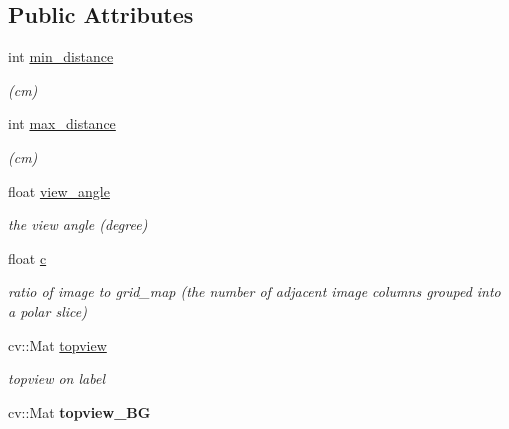 \subsection*{Public Attributes}
\begin{DoxyCompactItemize}
\item 
\hypertarget{class_top_view_a56c819ab3208d77a4b6f9dff80339524}{}int \hyperlink{class_top_view_a56c819ab3208d77a4b6f9dff80339524}{min\+\_\+distance}\label{class_top_view_a56c819ab3208d77a4b6f9dff80339524}

\begin{DoxyCompactList}\small\item\em (cm) \end{DoxyCompactList}\item 
\hypertarget{class_top_view_a4d6987318631da634e6121bc563d5bfb}{}int \hyperlink{class_top_view_a4d6987318631da634e6121bc563d5bfb}{max\+\_\+distance}\label{class_top_view_a4d6987318631da634e6121bc563d5bfb}

\begin{DoxyCompactList}\small\item\em (cm) \end{DoxyCompactList}\item 
\hypertarget{class_top_view_a1ad1a34440fcfb86672427e97b03870b}{}float \hyperlink{class_top_view_a1ad1a34440fcfb86672427e97b03870b}{view\+\_\+angle}\label{class_top_view_a1ad1a34440fcfb86672427e97b03870b}

\begin{DoxyCompactList}\small\item\em the view angle (degree) \end{DoxyCompactList}\item 
\hypertarget{class_top_view_ab5e6ef291472c707f5f4f51cd7d582a7}{}float \hyperlink{class_top_view_ab5e6ef291472c707f5f4f51cd7d582a7}{c}\label{class_top_view_ab5e6ef291472c707f5f4f51cd7d582a7}

\begin{DoxyCompactList}\small\item\em ratio of image to grid\+\_\+map (the number of adjacent image columns grouped into a polar slice) \end{DoxyCompactList}\item 
\hypertarget{class_top_view_a693454cfb21851b389634e28bdabe35a}{}cv\+::\+Mat \hyperlink{class_top_view_a693454cfb21851b389634e28bdabe35a}{topview}\label{class_top_view_a693454cfb21851b389634e28bdabe35a}

\begin{DoxyCompactList}\small\item\em topview on label \end{DoxyCompactList}\item 
\hypertarget{class_top_view_ab069be29953bc5f8e29d0799b44b6e43}{}cv\+::\+Mat {\bfseries topview\+\_\+\+B\+G}\label{class_top_view_ab069be29953bc5f8e29d0799b44b6e43}


\end{DoxyCompactItemize}
